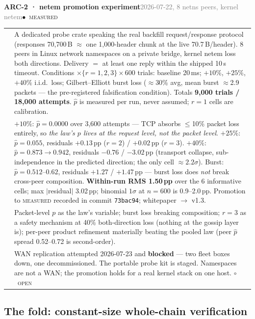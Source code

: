 \documentclass[10pt,a4paper]{article}
\makeatletter
\newcommand{\stM}{\textcolor{sigilcyan}{$\bullet$}~{\scriptsize\textcolor{sigilcyan}{\textsc{measured}}}}
\newcommand{\stO}{\textcolor{sigilamber}{$\circ$}~{\scriptsize\textcolor{sigilamber}{\textsc{open}}}}
\newcommand{\measured}[1]{\textcolor{sigilcyan}{\textbf{#1}}}
\newcommand{\frow}[2]{{\footnotesize\textcolor{gray}{\textsc{#1}}}\;&\small #2\\}
\newenvironment{mentry}[4]{%
\begin{tcolorbox}[enhanced,breakable,colback=white,colframe=slate,boxrule=0.6pt,arc=2pt,
  left=8pt,right=8pt,top=6pt,bottom=6pt,
  borderline west={3pt}{0pt}{sigilcyan!70!slate}]
{\small\textbf{#1 · #2}\hfill{\footnotesize\textcolor{gray}{#3}}\quad#4}\\[4pt]
\begin{tabular}{@{}>{\raggedleft\arraybackslash}p{1.8cm}p{13.2cm}@{}}
}{%
\end{tabular}
\end{tcolorbox}\vspace{2pt}}
\makeatother
\begin{document}
\begin{mentry}{ARC-2}{netem promotion experiment}{2026-07-22, 8 netns peers, kernel netem}{\stM}
\frow{method}{A dedicated probe crate speaking the real backfill request/response protocol
(responses 70{,}700\,B $\approx$ one 1{,}000-header chunk at the live 70.7\,B/header). 8
peers in Linux network namespaces on a private bridge, kernel netem loss both directions.
Delivery $=$ at least one reply within the shipped 10\,s timeout. Conditions
$\times\{r{=}1,2,3\}\times600$ trials: baseline 20\,ms; $+10\%$, $+25\%$, $+40\%$ i.i.d.\
loss; Gilbert--Elliott burst loss ($\approx$30\% avg, mean burst $\approx$2.9 packets ---
the pre-registered falsification condition). Totals \measured{9{,}000 trials / 18{,}000
attempts}. $\hat p$ is measured per run, never assumed; $r{=}1$ cells are calibration.}
\frow{result}{$+10\%$: $\hat p = 0.0000$ over 3{,}600 attempts --- TCP absorbs $\le$10\%
packet loss entirely, so \emph{the law's $p$ lives at the request level, not the packet
level}. $+25\%$: $\hat p = 0.055$, residuals $+0.13$\,pp ($r{=}2$) / $+0.02$\,pp ($r{=}3$).
$+40\%$: $\hat p = 0.873\to0.942$, residuals $-0.76$ / $-3.02$\,pp (transport collapse,
sub-independence in the predicted direction; the only cell $\approx 2.2\sigma$). Burst:
$\hat p = 0.512$--$0.62$, residuals $+1.27$ / $+1.47$\,pp --- burst loss does \emph{not}
break cross-peer composition. \measured{Within-run RMS 1.50\,pp} over the 6 informative
cells; max $|$residual$|$ 3.02\,pp; binomial $1\sigma$ at $n{=}600$ is 0.9--2.0\,pp.
Promotion to \textsc{measured} recorded in commit \texttt{73bac94}; whitepaper $\to$ v1.3.}
\frow{ruled out}{Packet-level $p$ as the law's variable; burst loss breaking composition;
$r{=}3$ as a safety mechanism at 40\% both-direction loss (nothing at the gossip layer
is); per-peer product refinement materially beating the pooled law (peer $\hat p$ spread
0.52--0.72 is second-order).}
\frow{open}{WAN replication attempted 2026-07-23 and \textbf{blocked} --- two fleet boxes
down, one decommissioned. The portable probe kit is staged. Namespaces are not a WAN;
the promotion holds for a real kernel stack on one host. \stO}
\end{mentry}

\subsection{The fold: constant-size whole-chain verification}
\end{document}
